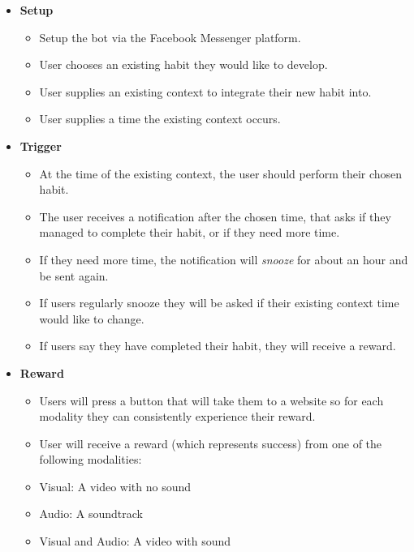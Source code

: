 \begin{itemize}
  \item \textbf{Setup}
  \begin{itemize}
    \item Setup the bot via the Facebook Messenger platform.
    \item User chooses an existing habit they would like to develop.
    \item User supplies an existing context to integrate their new habit into.
    \item User supplies a time the existing context occurs.
  \end{itemize}
  \item \textbf{Trigger}
  \begin{itemize}
    \item At the time of the existing context, the user should perform their chosen habit.
    \item The user receives a notification after the chosen time, that asks if they managed to complete their habit, or if they need more time.
    \item If they need more time, the notification will \textit{snooze} for about an hour and be sent again.
    \item If users regularly snooze they will be asked if their existing context time would like to change.
    \item If users say they have completed their habit, they will receive a reward.
  \end{itemize}
  \item \textbf{Reward}
  \begin{itemize}
    \item Users will press a button that will take them to a website so for each modality they can consistently experience their reward.
    \item User will receive a reward (which represents success) from one of the following modalities:
    \item Visual: A video with no sound
    \item Audio: A soundtrack
    \item Visual and Audio: A video with sound
  \end{itemize}
\end{itemize}


